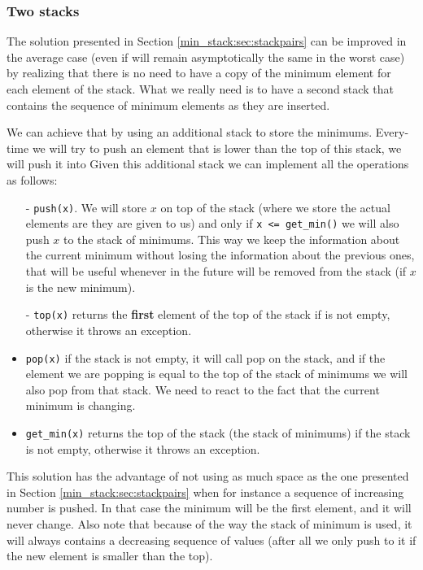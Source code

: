 \subsubsection{Two stacks}
\label{min_stack:sec:twostacks}
The solution presented in Section \ref{min_stack:sec:stackpairs} can be improved in the average case (even if will remain asymptotically the same in the worst case) by realizing that there is no need to have a copy of the minimum element for each element of the stack. What we really need is to have a second stack that contains the sequence of minimum elements as they are inserted. 

We can achieve that by using an additional stack to store the minimums. Every-time we will try to push an element that is lower than the top of this stack, we will push it into  Given this additional stack we can implement all the operations as follows:
\begin{itemize}
	\item[-]\lstinline[columns=fixed]{push(x)}. We will store $x$ on top of the  stack (where we store the actual elements are they are given to us)  and only if  \lstinline[columns=fixed]{x <= get_min()} we will also push $x$ to the stack of minimums. This way we keep the information about the current minimum without losing the information about the previous ones, that will be useful whenever in the future will be removed from the stack (if $x$ is the new minimum).
	\item[-]\lstinline[columns=fixed]{top(x)}  returns the \textbf{first} element of the top of the  stack if is not empty, otherwise it throws an exception.
	\item[-]\lstinline[columns=fixed]{pop(x)} if the stack is not empty, it will call pop on the  stack, and if the element we are popping is equal to the top of the stack of minimums we will also pop from that stack. We need to react to the fact that the current minimum is changing.
	\item[-]\lstinline[columns=fixed]{get_min(x)}  returns the top of the  stack (the stack of minimums) if the stack is not empty, otherwise it throws an exception.
\end{itemize}
This solution has the advantage of not using as much space as the one presented in Section \ref{min_stack:sec:stackpairs} when for instance a sequence of  increasing number is pushed. In that case the minimum will be the first element, and it will never change. Also note that because of the way the stack of minimum is used, it will always contains a decreasing sequence of values (after all we only push to it if the new element is smaller than the top).

